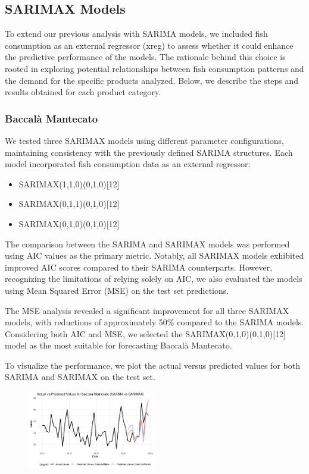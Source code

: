 \documentclass[10pt,twocolumn,letterpaper]{article}
\begin{document}
\subsection{SARIMAX Models}
To extend our previous analysis with SARIMA models, we included fish consumption as an external regressor (xreg) to assess whether it could enhance the predictive performance of the models. The rationale behind this choice is rooted in exploring potential relationships between fish consumption patterns and the demand for the specific products analyzed. Below, we describe the steps and results obtained for each product category.

\subsubsection{Baccalà Mantecato}

We tested three SARIMAX models using different parameter configurations, maintaining consistency with the previously defined SARIMA structures. Each model incorporated fish consumption data as an external regressor:
\begin{itemize}
    \item SARIMAX(1,1,0)(0,1,0)[12]
    \item SARIMAX(0,1,1)(0,1,0)[12]
    \item SARIMAX(0,1,0)(0,1,0)[12]
\end{itemize}

The comparison between the SARIMA and SARIMAX models was performed using AIC values as the primary metric. Notably, all SARIMAX models exhibited improved AIC scores compared to their SARIMA counterparts. However, recognizing the limitations of relying solely on AIC, we also evaluated the models using Mean Squared Error (MSE) on the test set predictions.

The MSE analysis revealed a significant improvement for all three SARIMAX models, with reductions of approximately 50\% compared to the SARIMA models. Considering both AIC and MSE, we selected the SARIMAX(0,1,0)(0,1,0)[12] model as the most suitable for forecasting Baccalà Mantecato.

To visualize the performance, we plot the actual versus predicted values for both SARIMA and SARIMAX on the test set. 
\begin{figure}[H]
    \centering
    \includegraphics[width=0.5\textwidth]{PlotsBEFD/M_COMPARE_SARIMAX_SARIMA_TEST_PRED.png} 
    \caption{}
    \label{fig:esempio}
\end{figure}
\end{document}
